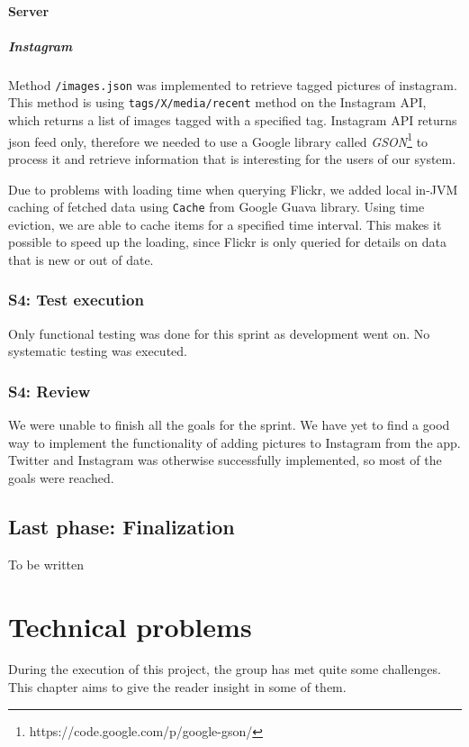 \documentclass[11pt]{book}
\begin{document}
\subsubsection{Server}

\paragraph{Instagram}
Method \texttt{/images.json} was implemented to retrieve tagged pictures of instagram. This method is using \texttt{tags/X/media/recent} method on the Instagram API, which returns a list of images tagged with a specified tag. Instagram API returns \gls{json} feed only, therefore we needed to use a Google library called \emph{GSON}\footnote{https://code.google.com/p/google-gson/} to process it and retrieve information that is interesting for the users of our system.

Due to problems with loading time when querying Flickr, we added local in-JVM caching of fetched data using \texttt{Cache} from Google Guava library. Using time eviction, we are able to cache items for a specified time interval. This makes it possible to speed up the loading, since Flickr is only queried for details on data that is new or out of date.


\subsection{S4: Test execution}
Only functional testing was done for this sprint as development went on. No systematic testing was executed.

\subsection{S4: Review}
We were unable to finish all the goals for the sprint. We have yet to find a good way to implement the functionality of adding pictures to Instagram from the app. Twitter and Instagram was otherwise successfully implemented, so most of the goals were reached.

\section{Last phase: Finalization}
To be written

\chapter{Technical problems}\label{chap:technical_problems}
During the execution of this project, the group has met quite some challenges. This chapter aims to give the reader insight in some of them.
\end{document}

